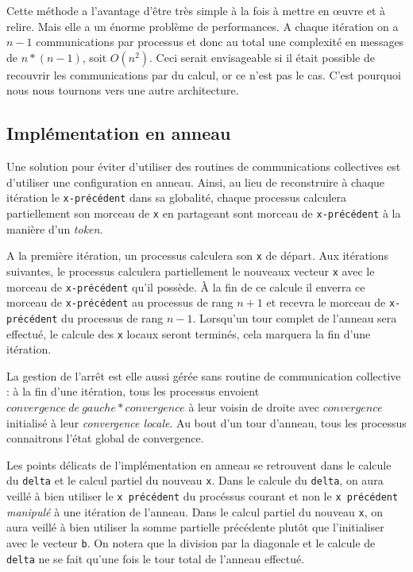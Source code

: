 \documentclass[a4paper]{article}
\begin{document}
Cette méthode a l'avantage d'être très simple à la fois à mettre
en \oe uvre et à relire. Mais elle a un énorme problème de
performances. A chaque itération on a $n - 1$ communications par
processus et donc au total une complexité en messages de $n*(n - 1)$,
soit $O(n^2)$. Ceci serait envisageable si il était possible de
recouvrir les communications par du calcul, or ce n'est pas le
cas. C'est pourquoi nous nous tournons vers une autre architecture.

\subsection{Implémentation en anneau}
Une solution pour éviter d'utiliser des routines de communications collectives
est d'utiliser une configuration en anneau. Ainsi, au lieu de reconstruire à 
chaque itération le \texttt{x-précédent} dans sa globalité, chaque processus
calculera partiellement son morceau de \texttt{x} en partageant sont morceau de 
\texttt{x-précédent} à la manière d'un \emph{token}. 

A la première itération, un processus calculera son \texttt{x} de départ. Aux
itérations suivantes, le processus calculera partiellement le nouveaux vecteur
\texttt{x} avec le morceau de \texttt{x-précédent} qu'il possède. À la fin de 
ce calcule il enverra ce morceau de \texttt{x-précédent} au processus de rang
$n + 1$ et recevra le morceau de \texttt{x-précédent} du processus de rang
$n - 1$. Lorsqu'un tour complet de l'anneau sera effectué, le calcule des 
\texttt{x} locaux seront terminés, cela marquera la fin d'une itération.

La gestion de l'arrêt est elle aussi gérée sans routine de communication 
collective : à la fin d'une itération, tous les processus envoient 
$convergence~de~gauche * convergence$ à leur voisin de droite avec $convergence$
initialisé à leur \emph{convergence locale}. Au bout d'un tour d'anneau, tous
les processus connaitrons l'état global de convergence.

Les points délicats de l'implémentation en anneau se retrouvent dans le 
calcule du \texttt{delta} et le calcul partiel du nouveau \texttt{x}. Dans le 
calcule du \texttt{delta}, on aura veillé à bien utiliser le \texttt{x précédent}
du procéssus courant et non le \texttt{x précédent} \emph{manipulé} à une itération
de l'anneau. Dans le calcul partiel du nouveau \texttt{x}, on aura veillé à bien
utiliser la somme partielle précédente plutôt que l'initialiser avec le vecteur
\texttt{b}. On notera que la division par la diagonale et le calcule de 
\texttt{delta} ne se fait qu'une fois le tour total de l'anneau effectué.
\end{document}
